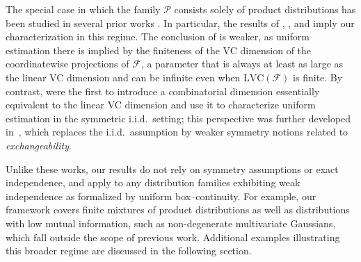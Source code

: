 \documentclass[arxiv]{colt2026}
\newcommand{\X}{\mathcal{X}}
\newcommand{\F}{\mathcal{F}}
\newcommand{\W}{\mathcal{W}}
\newcommand{\Pc}{\mathcal{P}}
\newcommand{\LVC}{\mathrm{LVC}}
\begin{document}
The special case in which the family $\Pc$ consists solely of product distributions has been studied in several prior works
\citep{cai2017,guo2020,harms2022,livni2019,coregliano2024}.
In particular, the results of \citet{cai2017}, \citet{livni2019}, and \citet{coregliano2024} imply our characterization in this regime.
The conclusion of \citet{cai2017} is weaker, as uniform estimation there is implied by the finiteness of the VC dimension of the coordinatewise projections of $\F$, a parameter that is always at least as large as the linear VC dimension 
and can be infinite even when $\LVC(\F)$ is finite.
By contrast, \citet{livni2019} were the first to introduce a combinatorial dimension essentially equivalent to the linear VC dimension and use it to characterize uniform estimation in the symmetric i.i.d.\ setting; this perspective was further developed in~\citet{coregliano2024}, which replaces the i.i.d.\ assumption by weaker symmetry notions related to \emph{exchangeability}.

Unlike these works, our results do not rely on symmetry assumptions or exact independence, and apply to any distribution families exhibiting weak independence as formalized by uniform box--continuity.
For example, our framework covers finite mixtures of product distributions as well as distributions with low mutual information, such as non-degenerate multivariate Gaussians, which fall outside the scope of previous work.
Additional examples illustrating this broader regime are discussed in the following section.

\end{document}
